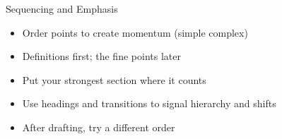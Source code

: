\documentclass[aspectratio=169]{beamer}
\begin{document}
\begin{frame}{Sequencing and Emphasis}
\begin{itemize}
  \item Order points to create momentum (simple \textrightarrow{} complex)
  \item Definitions first; the fine points later
  \item Put your strongest section where it counts
  \item Use headings and transitions to signal hierarchy and shifts
  \item After drafting, try a different order
\end{itemize}
\end{frame}
\end{document}
